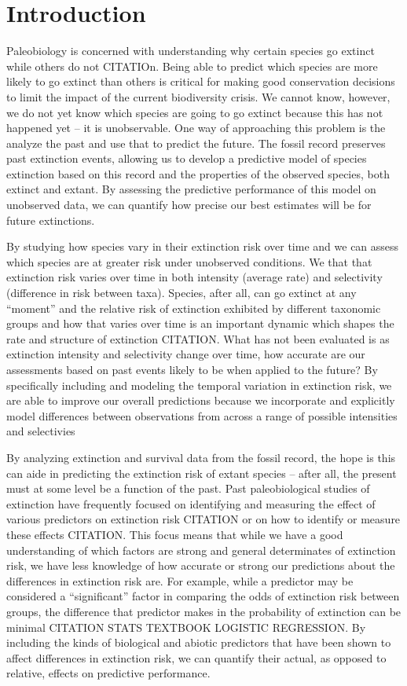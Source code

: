\documentclass[12pt,letterpaper]{article}
\begin{document}
\section{Introduction}

Paleobiology is concerned with understanding why certain species go extinct while others do not CITATIOn. Being able to predict which species are more likely to go extinct than others is critical for making good conservation decisions to limit the impact of the current biodiversity crisis. We cannot know, however, we do not yet know which species are going to go extinct because this has not happened yet -- it is unobservable. One way of approaching this problem is the analyze the past and use that to predict the future. The fossil record preserves past extinction events, allowing us to develop a predictive model of species extinction based on this record and the properties of the observed species, both extinct and extant. By assessing the predictive performance of this model on unobserved data, we can quantify how precise our best estimates will be for future extinctions. 

By studying how species vary in their extinction risk over time and we can assess which species are at greater risk under unobserved conditions. We that that extinction risk varies over time in both intensity (average rate) and selectivity (difference in risk between taxa). Species, after all, can go extinct at any ``moment'' and the relative risk of extinction exhibited by different taxonomic groups and how that varies over time is an important dynamic which shapes the rate and structure of extinction CITATION. What has not been evaluated is as extinction intensity and selectivity change over time, how accurate are our assessments based on past events likely to be when applied to the future? By specifically including and modeling the temporal variation in extinction risk, we are able to improve our overall predictions because we incorporate and explicitly model differences between observations from across a range of possible intensities and selectivies

By analyzing extinction and survival data from the fossil record, the hope is this can aide in predicting the extinction risk of extant species -- after all, the present must at some level be a function of the past. Past paleobiological studies of extinction have frequently focused on identifying and measuring the effect of various predictors on extinction risk CITATION or on how to identify or measure these effects CITATION. This focus means that while we have a good understanding of which factors are strong and general determinates of extinction risk, we have less knowledge of how accurate or strong our predictions about the differences in extinction risk are. For example, while a predictor may be considered a ``significant'' factor in comparing the odds of extinction risk between groups, the difference that predictor makes in the probability of extinction can be minimal CITATION STATS TEXTBOOK LOGISTIC REGRESSION. By including the kinds of biological and abiotic predictors that have been shown to affect differences in extinction risk, we can quantify their actual, as opposed to relative, effects on predictive performance.
\end{document}
